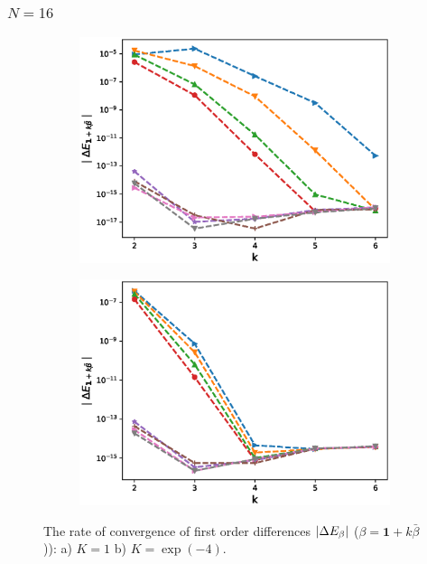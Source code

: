 \documentclass[11pt]{article}
\begin{document}
\newpage
\subsubsection*{$N=16$ }


\begin{figure}[h!]
	\centering
	\begin{subfigure}{.5\textwidth}
		\centering
		\includegraphics[width=1\linewidth]{./figures/mixed_diff_second_way/H_043/N_16/first_difference_rbergomi_16steps_H_043_K_1.eps}
		\caption{}
		\label{fig:sub3}
	\end{subfigure}%
	\begin{subfigure}{.5\textwidth}
		\centering
		\includegraphics[width=1\linewidth]{./figures/mixed_diff_second_way/H_043/N_16/first_difference_rbergomi_16steps_H_043_K_exp__4.eps}
		\caption{}
		\label{fig:sub4}
	\end{subfigure}
	
	\caption{The rate of convergence of  first order differences $\left\lvert\Delta E_{\beta}\right\rvert$ ($\beta=\mathbf{1}+k \bar{\beta}$)): a) $K=1$ b)  $K=\operatorname{exp}(-4).$}
	\label{fig:test2}
\end{figure}
\end{document}
